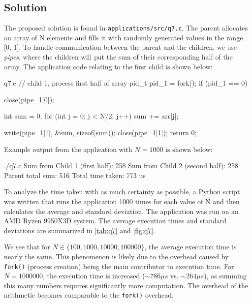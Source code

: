 \documentclass[../main.tex]{subfiles}
\begin{document}
\subsection*{Solution}

The proposed solution is found in \lstinline{applications/src/q7.c}. The parent allocates an array of N elements and fills it with randomly generated values in the range [0, 1]. To handle communication between the parent and the children, we use \textit{pipes}, where the children will put the sum of their corresponding half of the array. The application code relating to the first child is shown below:


\begin{cppminted}{q7.c}
// child 1, process first half of array
pid_t pid_1 = fork();
if (pid_1 == 0) {
    close(pipe_1[0]);

    int sum = 0;
    for (int j = 0; j < N/2; j++) {
        sum += arr[j];
    }

    write(pipe_1[1], &sum, sizeof(sum));
    close(pipe_1[1]);
    return 0;
}
\end{cppminted}

Example output from the application with $N = 1000$ is shown below:

\begin{mintedterminal}{./q7.c}
Sum from Child 1 (first half):    258
Sum from Child 2 (second half):   258
Parent total sum:                 516
Total time taken:                 773 us
\end{mintedterminal}

\newpage

To analyze the time taken with as much certainty as possible, a Python script was written that runs the application 1000 times for each value of N and then calculates the average and standard deviation. The application was run on an AMD Ryzen 9950X3D system. The average execution times and standard deviations are summarized in \cref{tab:q7} and \cref{fig:q7}.

We see that for $N \in \{100, 1000, 10000, 100000\}$, the average execution time is nearly the same. This phenomenon is likely due to the overhead caused by \lstinline{fork()} (process creation) being the main contributor to execution time. For $N = 1000000$, the execution time is increased ($\sim786 \mu\si{s}$ vs. $\sim264 \mu\si{s}$), as summing this many numbers requires significantly more computation. The overhead of the arithmetic becomes comparable to the \lstinline{fork()} overhead.
\end{document}
